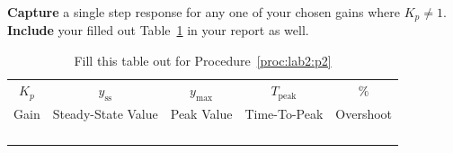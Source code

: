 %
\begin{deliverable}[label={lab2:d2}]
  \textbf{Capture} a single step response for any one of your chosen
  gains where \(K_p \neq 1.\) \textbf{Include} your filled out
  Table~\ref{tab:lab2:p2} in your report as well.
\end{deliverable}
%
\begin{table}
  \centering
  \begin{tabular}{c|c|c|c|c}
    \(K_p\)
      & \(y_\mathrm{ss}\)
      & \(y_\mathrm{max}\)
      & \(T_\mathrm{peak}\)
      & \(\%\) \\
    Gain
      & Steady-State Value
      & Peak Value
      & Time-To-Peak
      & Overshoot \\ \hline
    & & & & \\ \hline
    & & & & \\ \hline
    & & & & \\ \hline
    & & & &
  \end{tabular}
  \caption[Lab 2: Recording Characteristics]{
    Fill this table out for Procedure~\ref{proc:lab2:p2}
  }
  \label{tab:lab2:p2}
\end{table}
%

